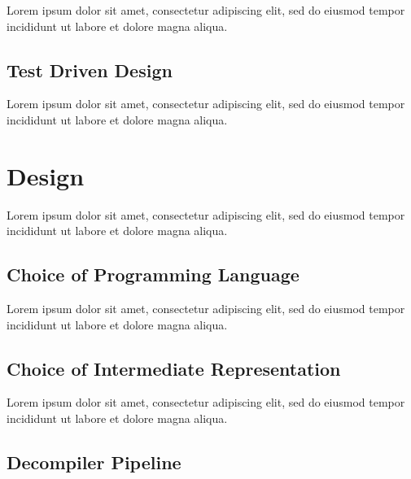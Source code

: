 \documentclass[12pt, a4paper]{article}
\begin{document}
Lorem ipsum dolor sit amet, consectetur adipiscing elit, sed do eiusmod tempor incididunt ut labore et dolore magna aliqua.


\subsection{Test Driven Design}

Lorem ipsum dolor sit amet, consectetur adipiscing elit, sed do eiusmod tempor incididunt ut labore et dolore magna aliqua.


\section{Design}

Lorem ipsum dolor sit amet, consectetur adipiscing elit, sed do eiusmod tempor incididunt ut labore et dolore magna aliqua.


\subsection{Choice of Programming Language}

Lorem ipsum dolor sit amet, consectetur adipiscing elit, sed do eiusmod tempor incididunt ut labore et dolore magna aliqua.




\subsection{Choice of Intermediate Representation}

Lorem ipsum dolor sit amet, consectetur adipiscing elit, sed do eiusmod tempor incididunt ut labore et dolore magna aliqua.


\subsection{Decompiler Pipeline}
\end{document}
